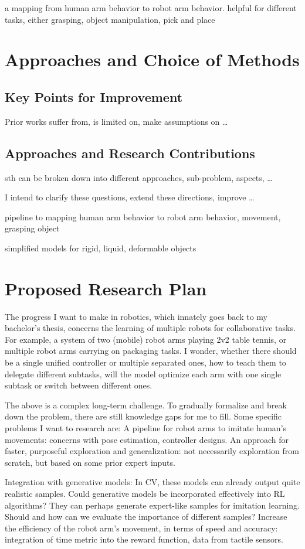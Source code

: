 a mapping from human arm behavior to robot arm behavior. helpful for different tasks, either grasping, object manipulation, pick and place

\section{Approaches and Choice of Methods}
\subsection{Key Points for Improvement}
Prior works suffer from, is limited on, make assumptions on \dots
\subsection{Approaches and Research Contributions}
sth can be broken down into different approaches, sub-problem, aspects, \dots

I intend to clarify these questions, extend these directions, improve \dots

pipeline to mapping human arm behavior to robot arm behavior, movement, grasping object

simplified models for rigid, liquid, deformable objects

\section{Proposed Research Plan}
The progress I want to make in robotics, which innately goes back to my bachelor’s thesis, concerns the learning of multiple robots for collaborative tasks. For example, a system of two (mobile) robot arms playing 2v2 table tennis, or multiple robot arms carrying on packaging tasks. I wonder, whether there should be a single unified controller or multiple separated ones, how to teach them to delegate different subtasks, will the model optimize each arm with one single subtask or switch between different ones.

The above is a complex long-term challenge. To gradually formalize and break down the problem, there are still knowledge gaps for me to fill. Some specific problems I want to research are:
A pipeline for robot arms to imitate human’s movements: concerns with pose estimation, controller designs.
An approach for faster, purposeful exploration and generalization: not necessarily exploration from scratch, but based on some prior expert inputs.

Integration with generative models: In CV, these models can already output quite realistic samples. Could generative models be incorporated effectively into RL algorithms? They can perhaps generate expert-like samples for imitation learning. Should and how can we evaluate the importance of different samples?
Increase the efficiency of the robot arm’s movement, in terms of speed and accuracy: integration of time metric into the reward function, data from tactile sensors.

